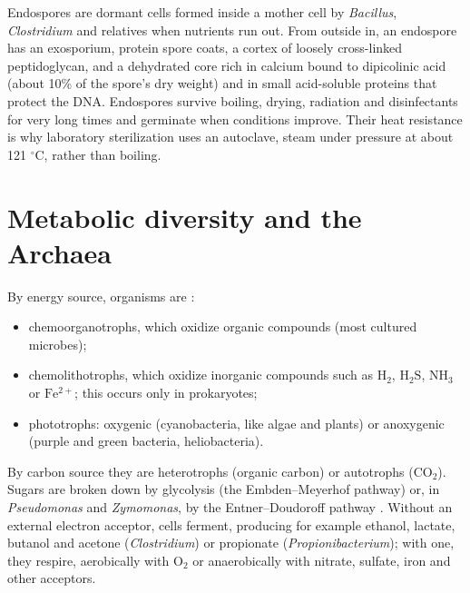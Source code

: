 Endospores \cite[Section
3.12]{madigan2012brock} are dormant cells
formed inside a mother cell by
\emph{Bacillus}, \emph{Clostridium} and
relatives when nutrients run out. From
outside in, an endospore has an exosporium,
protein spore coats, a cortex of loosely
cross-linked peptidoglycan, and a dehydrated
core rich in calcium bound to dipicolinic
acid (about 10\% of the spore's dry weight)
and in small acid-soluble proteins that
protect the DNA. Endospores survive boiling,
drying, radiation and disinfectants for very
long times and germinate when conditions
improve. Their heat resistance is why
laboratory sterilization uses an autoclave,
steam under pressure at about 121 $^\circ$C,
rather than boiling.

\section{Metabolic diversity and the Archaea}
\label{section-metabolism-archaea}

By energy source, organisms are \cite[Section
2.8]{madigan2012brock}:
\begin{itemize}
\item chemoorganotrophs, which oxidize
organic compounds (most cultured microbes);
\item chemolithotrophs, which oxidize
inorganic compounds such as $\mathrm{H_2}$,
$\mathrm{H_2S}$, $\mathrm{NH_3}$ or
$\mathrm{Fe^{2+}}$; this occurs only in
prokaryotes;
\item phototrophs: oxygenic (cyanobacteria,
like algae and plants) or anoxygenic (purple
and green bacteria, heliobacteria).
\end{itemize}
By carbon source they are heterotrophs
(organic carbon) or autotrophs
($\mathrm{CO_2}$). Sugars are broken down by
glycolysis (the Embden--Meyerhof pathway) or,
in \emph{Pseudomonas} and \emph{Zymomonas},
by the Entner--Doudoroff pathway
\cite[Section 14.2]{madigan2012brock}.
Without an external electron acceptor, cells
ferment, producing for example ethanol,
lactate, butanol and acetone
(\emph{Clostridium}) or propionate
(\emph{Propionibacterium}); with one, they
respire, aerobically with $\mathrm{O_2}$ or
anaerobically with nitrate, sulfate, iron and
other acceptors.

